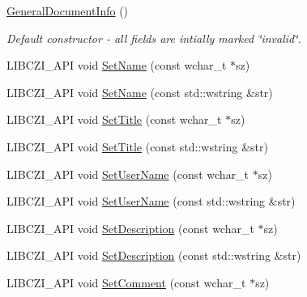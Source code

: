 \begin{DoxyCompactItemize}
\item 
\mbox{\label{structlib_c_z_i_1_1_general_document_info_a84d09d72d5787e904d356c022cb18b9f}} 
\hyperlink{structlib_c_z_i_1_1_general_document_info_a84d09d72d5787e904d356c022cb18b9f}{General\+Document\+Info} ()
\begin{DoxyCompactList}\small\item\em Default constructor -\/ all fields are intially marked \char`\"{}invalid\char`\"{}. \end{DoxyCompactList}\item 
L\+I\+B\+C\+Z\+I\+\_\+\+A\+PI void \hyperlink{structlib_c_z_i_1_1_general_document_info_ae420aa422c15cc06ffa90e2973abf20a}{Set\+Name} (const wchar\+\_\+t $\ast$sz)
\item 
L\+I\+B\+C\+Z\+I\+\_\+\+A\+PI void \hyperlink{structlib_c_z_i_1_1_general_document_info_a8dde64dffbd8d98ec31e4b91708280ae}{Set\+Name} (const std\+::wstring \&str)
\item 
L\+I\+B\+C\+Z\+I\+\_\+\+A\+PI void \hyperlink{structlib_c_z_i_1_1_general_document_info_a1ea606405f5b43102642a715eec17b53}{Set\+Title} (const wchar\+\_\+t $\ast$sz)
\item 
L\+I\+B\+C\+Z\+I\+\_\+\+A\+PI void \hyperlink{structlib_c_z_i_1_1_general_document_info_a860b74a7e96da05ed2cd6cf74bf7b2c1}{Set\+Title} (const std\+::wstring \&str)
\item 
L\+I\+B\+C\+Z\+I\+\_\+\+A\+PI void \hyperlink{structlib_c_z_i_1_1_general_document_info_a43ecc2bfab87e68916893d5520845fe1}{Set\+User\+Name} (const wchar\+\_\+t $\ast$sz)
\item 
L\+I\+B\+C\+Z\+I\+\_\+\+A\+PI void \hyperlink{structlib_c_z_i_1_1_general_document_info_a20eceeaadb42b66a2d3d022a5f0e2c98}{Set\+User\+Name} (const std\+::wstring \&str)
\item 
L\+I\+B\+C\+Z\+I\+\_\+\+A\+PI void \hyperlink{structlib_c_z_i_1_1_general_document_info_adc2aed7b82ffa3880f89290b7ed29a86}{Set\+Description} (const wchar\+\_\+t $\ast$sz)
\item 
L\+I\+B\+C\+Z\+I\+\_\+\+A\+PI void \hyperlink{structlib_c_z_i_1_1_general_document_info_ac5d60eb8819a6f91f33ac7177091b29b}{Set\+Description} (const std\+::wstring \&str)
\item 
L\+I\+B\+C\+Z\+I\+\_\+\+A\+PI void \hyperlink{structlib_c_z_i_1_1_general_document_info_ac49ad90e783ea088df441c02d07bfcbf}{Set\+Comment} (const wchar\+\_\+t $\ast$sz)

\end{DoxyCompactItemize}
